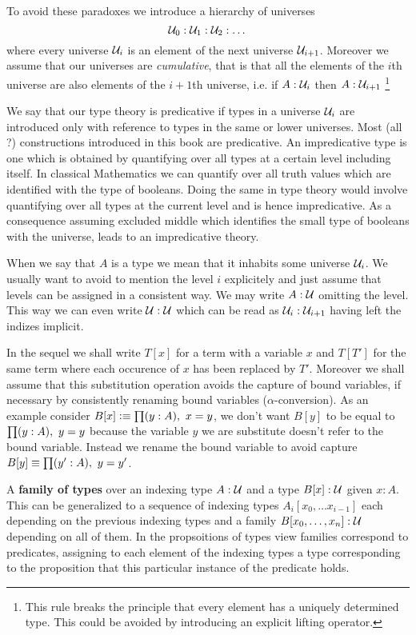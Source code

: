 To avoid these paradoxes we introduce a hierarchy of universes
\[ \mathcal{U}_0 : \mathcal{U}_1 : \mathcal{U}_2 : \dots \]
where every universe $\mathcal{U}_i$ is an element of the next universe
$\mathcal{U}_{i+1}$. Moreover we assume that our universes are
\emph{cumulative}, that is that all the elements of the $i$th
universe are also elements of the $i+1$th universe, i.e. if
$A:\mathcal{U}_i$ then $A:\mathcal{U}_{i+1}$
\footnote{This rule breaks the principle that every element
  has a uniquely determined type. This could be avoided by introducing
  an explicit lifting operator.}

We say that our type theory is predicative if types in a universe
$\mathcal{U}_i$ are introduced only with reference to types in the same or
lower universes. Most (all ?) constructions introduced in this book
are predicative. An impredicative type is one which is obtained by
quantifying over all types at a certain level including itself. In
classical Mathematics we can quantify over all truth values which are
identified with the type of booleans. Doing the same in type theory
would involve quantifying over all types at the current level and is
hence impredicative. As a consequence assuming excluded middle which
identifies the small type of booleans with the universe, leads to an
impredicative theory.

When we say that $A$ is a type we mean that it inhabits some universe
$\mathcal{U}_i$. We usually want to avoid to mention the level $i$ explicitely
and just assume that levels can be assigned in a consistent way. We
may write $A:\mathcal{U}$ omitting the level. This way we can even write
$\mathcal{U}:\mathcal{U}$ which can be read as $\mathcal{U}_i:\mathcal{U}_{i+1}$ having left the
indizes implicit. 

In the sequel we shall write $T[x]$ for a term with a variable $x$ and
$T[T']$ for the same term where each occurence of $x$ has been
replaced by $T'$. Moreover we shall assume that this substitution
operation avoids the capture of bound variables, if necessary by
consistently renaming bound variables ($\alpha$-conversion).
As an example consider $B[x] \defeq \prd{y:A}x = y$, we don't want
$B[y]$ to be equal to $\prd{y:A}y = y$ because the variable $y$ we are
substitute doesn't refer to the bound variable. Instead we rename the
bound variable to avoid capture $B[y] \jdeq \prd{y':A}y = y'$.

A \textbf{family of types} over an indexing type $A:\mathcal{U}$ and a 
type $B[x] : \mathcal{U}$ given $x:A$. This can be generalized to a sequence of indexing
types $A_i[x_0,\dots x_{i-1}]$ each depending on the previous indexing
types and a family $B[x_0,\dots,x_n] : \mathcal{U}$ depending on all of them. In the
propsoitions of types view families correspond to predicates,
assigning to each element of the indexing types a type corresponding
to the proposition that this particular instance of the predicate holds.

